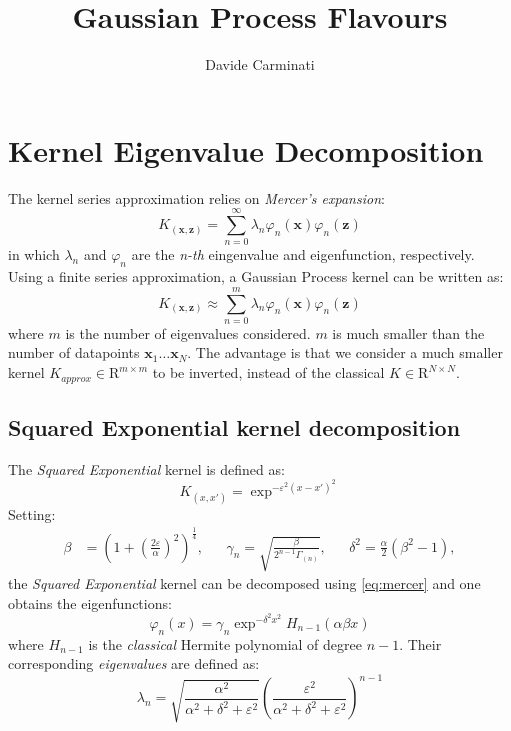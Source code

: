 \documentclass[10pt,a4paper,twocolumn]{article}
\title{\huge Gaussian Process Flavours}
\author{Davide Carminati}
\date{}
\begin{document}
	
\maketitle


\section{Kernel Eigenvalue Decomposition}
The kernel series approximation relies on \textit{Mercer's expansion}:
\begin{equation}\label{eq:mercer}
	K_{(\mathbf{x}, \mathbf{z})} = \sum_{n=0}^{\infty} \lambda_n \varphi_n(\mathbf{x}) \varphi_n(\mathbf{z})
\end{equation}
in which $\lambda_n$ and $\varphi_n$ are the \textit{n-th} eingenvalue and eigenfunction, respectively.
Using a finite series approximation, a Gaussian Process kernel can be written as:
\begin{equation}
	K_{(\mathbf{x}, \mathbf{z})} \approx \sum_{n=0}^{m} \lambda_n \varphi_n(\mathbf{x}) \varphi_n(\mathbf{z})
\end{equation}
where $m$ is the number of eigenvalues considered. $m$ is much smaller than the number of datapoints $\mathbf{x}_1 \ldots \mathbf{x}_N$. The advantage is that we consider a much smaller kernel $K_{approx} \in \mathrm{R}^{m \times m}$ to be inverted, instead of the classical $K \in \mathrm{R}^{N \times N}$.
\subsection{Squared Exponential kernel decomposition}
The \textit{Squared Exponential} kernel is defined as:
\begin{equation}
	K_{(x,x')} = \exp^ {-\varepsilon^2 (x - x')^2 }
\end{equation}
Setting:
\small
\begin{align}
	 \beta &= \left(1 + \left(\frac{2\varepsilon}{\alpha}\right)^2\right)^\frac{1}{4}, && \gamma_n = \sqrt{\frac{\beta}{2^{n-1}\Gamma_{(n)}}}, && \delta^2 = \frac{\alpha}{2}(\beta^2-1),
\end{align}
\normalsize
the \textit{Squared Exponential} kernel can be decomposed using \autoref{eq:mercer} and one obtains the eigenfunctions:
\begin{equation}
	\varphi_n(x) = \gamma_n \exp^{-\delta^2 x^2} H_{n-1}(\alpha \beta x)
\end{equation}
where $H_{n-1}$ is the \textit{classical} Hermite polynomial of degree $n-1$.
Their corresponding \textit{eigenvalues} are defined as:
\begin{equation}
	\lambda_n = \sqrt{\frac{\alpha^2}{\alpha^2 + \delta^2 + \varepsilon^2}} \left(\frac{\varepsilon^2}{\alpha^2 + \delta^2 + \varepsilon^2} \right)^{n-1}
\end{equation}
\end{document}
